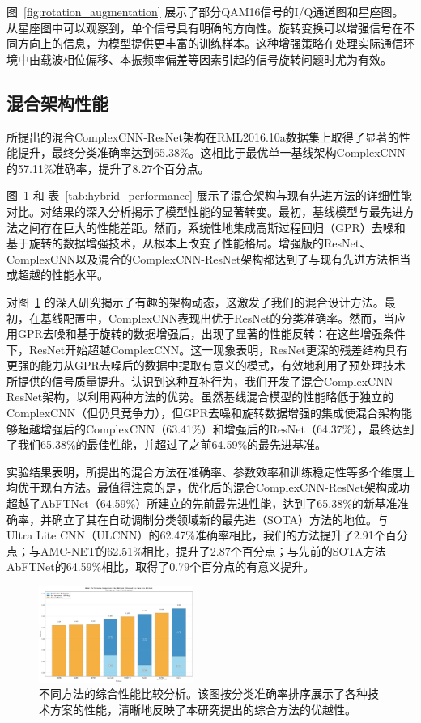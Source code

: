 \documentclass[conference]{IEEEtran}
\begin{document}
图~\ref{fig:rotation_augmentation} 展示了部分QAM16信号的I/Q通道图和星座图。从星座图中可以观察到，单个信号具有明确的方向性。旋转变换可以增强信号在不同方向上的信息，为模型提供更丰富的训练样本。这种增强策略在处理实际通信环境中由载波相位偏移、本振频率偏差等因素引起的信号旋转问题时尤为有效。

\subsection{混合架构性能}

所提出的混合ComplexCNN-ResNet架构在RML2016.10a数据集上取得了显著的性能提升，最终分类准确率达到65.38\%。这相比于最优单一基线架构ComplexCNN的57.11\%准确率，提升了8.27个百分点。

图~\ref{fig:method_comparison} 和 表~\ref{tab:hybrid_performance} 展示了混合架构与现有先进方法的详细性能对比。对结果的深入分析揭示了模型性能的显著转变。最初，基线模型与最先进方法之间存在巨大的性能差距。然而，系统性地集成高斯过程回归（GPR）去噪和基于旋转的数据增强技术，从根本上改变了性能格局。增强版的ResNet、ComplexCNN以及混合的ComplexCNN-ResNet架构都达到了与现有先进方法相当或超越的性能水平。

对图~\ref{fig:method_comparison} 的深入研究揭示了有趣的架构动态，这激发了我们的混合设计方法。最初，在基线配置中，ComplexCNN表现出优于ResNet的分类准确率。然而，当应用GPR去噪和基于旋转的数据增强后，出现了显著的性能反转：在这些增强条件下，ResNet开始超越ComplexCNN。这一现象表明，ResNet更深的残差结构具有更强的能力从GPR去噪后的数据中提取有意义的模式，有效地利用了预处理技术所提供的信号质量提升。认识到这种互补行为，我们开发了混合ComplexCNN-ResNet架构，以利用两种方法的优势。虽然基线混合模型的性能略低于独立的ComplexCNN（但仍具竞争力），但GPR去噪和旋转数据增强的集成使混合架构能够超越增强后的ComplexCNN（63.41\%）和增强后的ResNet（64.37\%），最终达到了我们65.38\%的最佳性能，并超过了之前64.59\%的最先进基准。

实验结果表明，所提出的混合方法在准确率、参数效率和训练稳定性等多个维度上均优于现有方法。最值得注意的是，优化后的混合ComplexCNN-ResNet架构成功超越了AbFTNet（64.59\%）所建立的先前最先进性能，达到了65.38\%的新基准准确率，并确立了其在自动调制分类领域新的最先进（SOTA）方法的地位。与Ultra Lite CNN（ULCNN）的62.47\%准确率相比，我们的方法提升了2.91个百分点；与AMC-NET的62.51\%相比，提升了2.87个百分点；与先前的SOTA方法AbFTNet的64.59\%相比，取得了0.79个百分点的有意义提升。

\begin{figure}[htbp]
\centering
\includegraphics[width=0.45\textwidth]{figure/sorted_stacked_comparison.png}
\caption{不同方法的综合性能比较分析。该图按分类准确率排序展示了各种技术方案的性能，清晰地反映了本研究提出的综合方法的优越性。}
\label{fig:method_comparison}
\end{figure}
\end{document}
